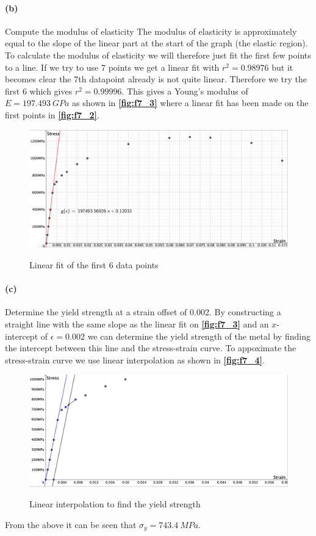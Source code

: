 \paragraph{(b)} Compute the modulus of elasticity
\bigbreak
The modulus of elasticity is approximately equal to the slope of the linear part at the start of the graph (the elastic region). To calculate the modulus of elasticity we will therefore just fit the first few points to a line. If we try to use 7 points we get a linear fit with $r^2 = \num{0,98976}$ but it becomes clear the 7th datapoint already is not quite linear. Therefore we try the first 6 which gives $r^2 = \num{0,99996}$. This gives a Young's modulus of $E = \qty{197,493}{GPa}$ as shown in \textbf{\autoref{fig:f7_3}} where a linear fit has been made on the first points in \textbf{\autoref{fig:f7_2}}.

\begin{figure} [ht]
  \centering
  \caption{Linear fit of the first 6 data points}
  \includegraphics[width=0.8\linewidth]{./figures/f7_3.png}
  \label{fig:f7_3}
\end{figure}

\paragraph{(c)} Determine the yield strength at a strain offset of \num{0,002}.
\bigbreak
By constructing a straight line with the same slope as the linear fit on \textbf{\autoref{fig:f7_3}} and an $x$-intercept of $\epsilon = \num{0,002}$ we can determine the yield strength of the metal by finding the intercept between this line and the stress-strain curve. To appoximate the stress-strain curve we use linear interpolation as shown in \textbf{\autoref{fig:f7_4}}.
\begin{figure} [ht]
  \centering
  \caption{Linear interpolation to find the yield strength}
  \includegraphics[width=0.8\linewidth]{./figures/f7_4.png}
  \label{fig:f7_4}
\end{figure}
From the above it can be seen that $\sigma_y = \qty{743,4}{MPa}$.

